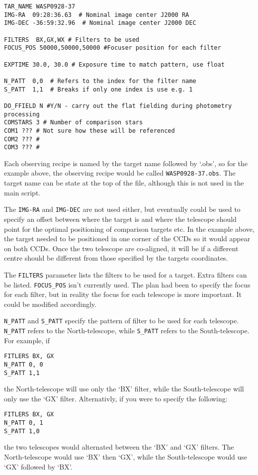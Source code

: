 \documentclass[a4paper,12pt]{article}
\begin{document}
\begin{lstlisting}[caption={WASP0928-37.obs - An example of an observing recipe}, label={list: obsRec1}]
TAR_NAME WASP0928-37
IMG-RA  09:28:36.63  # Nominal image center J2000 RA
IMG-DEC -36:59:32.96  # Nominal image center J2000 DEC

FILTERS  BX,GX,WX # Filters to be used
FOCUS_POS 50000,50000,50000 #Focuser position for each filter

EXPTIME 30.0, 30.0 # Exposure time to match pattern, use float

N_PATT  0,0  # Refers to the index for the filter name
S_PATT  1,1  # Breaks if only one index is use e.g. 1

DO_FFIELD N #Y/N - carry out the flat fielding during photometry processing
COMSTARS 3 # Number of comparison stars
COM1 ??? # Not sure how these will be referenced
COM2 ??? #
COM3 ??? #
\end{lstlisting}

Each observing recipe is named by the target name followed by `.obs', so for the example above, the observing recipe would be called {\tt WASP0928-37.obs}. The target name can be state at the top of the file, although this is not used in the main script. 

The {\tt IMG-RA} and {\tt IMG-DEC} are not used either, but eventually could be used to specify an offset between where the target is and where the telescope should point for the optimal positioning of comparison targets etc. In the example above, the target needed to be positioned in one corner of the CCDs so it would appear on both CCDs. Once the two telescope are co-aligned, it will be if a different centre should be different from those specified by the targets coordinates. 

The {\tt FILTERS} parameter lists the filters to be used for a target. Extra filters can be listed. {\tt FOCUS\_POS} isn't currently used. The plan had been to specify the focus for each filter, but in reality the focus for each telescope is more important. It could be modified accordingly. 

{\tt N\_PATT} and {\tt S\_PATT} specify the pattern of filter to be used for each telescope. {\tt N\_PATT} refers to the North-telescope, while {\tt S\_PATT} refers to the South-telescope. For example, if
\begin{verbatim}
FITLERS BX, GX
N_PATT 0, 0
S_PATT 1,1
\end{verbatim}
the North-telescope will use only the `BX' filter, while the South-telescope will only use the `GX' filter. Alternativly, if you were to specify the following:
\begin{verbatim}
FITLERS BX, GX
N_PATT 0, 1
S_PATT 1,0
\end{verbatim}
the two telescopes would alternated between the `BX' and `GX' filters. The North-telescope would use `BX' then `GX', while the South-telescope would use `GX' followed by `BX'.
\end{document}

